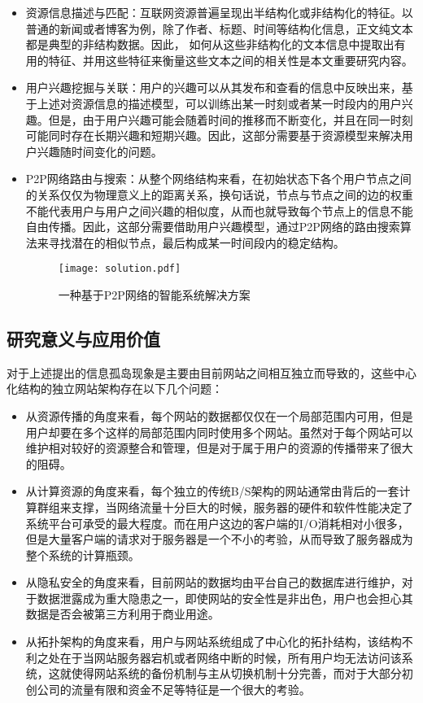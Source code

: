 \begin{itemize}
\item 资源信息描述与匹配：互联网资源普遍呈现出半结构化或非结构化的特征。以普通的新闻或者博客为例，除了作者、标题、时间等结构化信息，正文纯文本都是典型的非结构数据。因此， 如何从这些非结构化的文本信息中提取出有用的特征、并用这些特征来衡量这些文本之间的相关性是本文重要研究内容。
\item 用户兴趣挖掘与关联：用户的兴趣可以从其发布和查看的信息中反映出来，基于上述对资源信息的描述模型，可以训练出某一时刻或者某一时段内的用户兴趣。但是，由于用户兴趣可能会随着时间的推移而不断变化，并且在同一时刻可能同时存在长期兴趣和短期兴趣。因此，这部分需要基于资源模型来解决用户兴趣随时间变化的问题。
\item P2P网络路由与搜索：从整个网络结构来看，在初始状态下各个用户节点之间的关系仅仅为物理意义上的距离关系，换句话说，节点与节点之间的边的权重不能代表用户与用户之间兴趣的相似度，从而也就导致每个节点上的信息不能自由传播。因此，这部分需要借助用户兴趣模型，通过P2P网络的路由搜索算法来寻找潜在的相似节点，最后构成某一时间段内的稳定结构。 

\begin{figure}[ht]
\centering
\texttt{[image: solution.pdf]}
\caption{一种基于P2P网络的智能系统解决方案}
\label{fig:solution}
\end{figure}
\end{itemize}

\subsection{研究意义与应用价值}
对于上述提出的信息孤岛现象是主要由目前网站之间相互独立而导致的，这些中心化结构的独立网站架构存在以下几个问题：

\begin{itemize}
\item 从资源传播的角度来看，每个网站的数据都仅仅在一个局部范围内可用，但是用户却要在多个这样的局部范围内同时使用多个网站。虽然对于每个网站可以维护相对较好的资源整合和管理，但是对于属于用户的资源的传播带来了很大的阻碍。
\item 从计算资源的角度来看，每个独立的传统B/S架构的网站通常由背后的一套计算群组来支撑，当网络流量十分巨大的时候，服务器的硬件和软件性能决定了系统平台可承受的最大程度。而在用户这边的客户端的I/O消耗相对小很多，但是大量客户端的请求对于服务器是一个不小的考验，从而导致了服务器成为整个系统的计算瓶颈。
\item 从隐私安全的角度来看，目前网站的数据均由平台自己的数据库进行维护，对于数据泄露成为重大隐患之一，即使网站的安全性是非出色，用户也会担心其数据是否会被第三方利用于商业用途。
\item 从拓扑架构的角度来看，用户与网站系统组成了中心化的拓扑结构，该结构不利之处在于当网站服务器宕机或者网络中断的时候，所有用户均无法访问该系统，这就使得网站系统的备份机制与主从切换机制十分完善，而对于大部分初创公司的流量有限和资金不足等特征是一个很大的考验。
\end{itemize}
  
